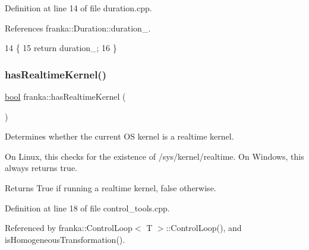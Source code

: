 Definition at line 14 of file duration.\+cpp.



References franka\+::\+Duration\+::duration\+\_\+.


\begin{DoxyCode}
14                                                                         \{
15   \textcolor{keywordflow}{return} duration\_;
16 \}
\end{DoxyCode}
\mbox{\label{namespacefranka_ad165a74da105c78586c0cd4c1ed57bd2}} 
\subsubsection{\texorpdfstring{has\+Realtime\+Kernel()}{hasRealtimeKernel()}}
{\footnotesize\ttfamily \hyperlink{classbool}{bool} franka\+::has\+Realtime\+Kernel (\begin{DoxyParamCaption}{ }\end{DoxyParamCaption})}

Determines whether the current OS kernel is a realtime kernel.

On Linux, this checks for the existence of {\ttfamily /sys/kernel/realtime}. On Windows, this always returns true.

\begin{DoxyReturn}{Returns}
True if running a realtime kernel, false otherwise. 
\end{DoxyReturn}


Definition at line 18 of file control\+\_\+tools.\+cpp.



Referenced by franka\+::\+Control\+Loop$<$ T $>$\+::\+Control\+Loop(), and is\+Homogeneous\+Transformation().


